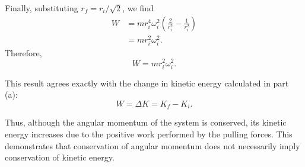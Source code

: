 \documentclass[../main.tex]{subfiles}
\begin{document}
Finally, substituting $r_f=r_i/\sqrt{2}$, we find
\begin{align}
    W
    &=mr_i^4\omega_i^2
    \left(\frac{2}{r_i^2}-\frac{1}{r_i^2}\right)\\
    &=mr_i^2\omega_i^2.
\end{align}
Therefore,
\begin{equation}
    \boxed{W=mr_i^2\omega_i^2}.
\end{equation}

This result agrees exactly with the change in kinetic energy calculated in part (a):
\begin{equation}
    \boxed{W=\Delta K=K_f-K_i}.
\end{equation}

Thus, although the angular momentum of the system is conserved, its kinetic energy increases due to the positive work performed by the pulling forces. This demonstrates that conservation of angular momentum does not necessarily imply conservation of kinetic energy.
\end{document}
